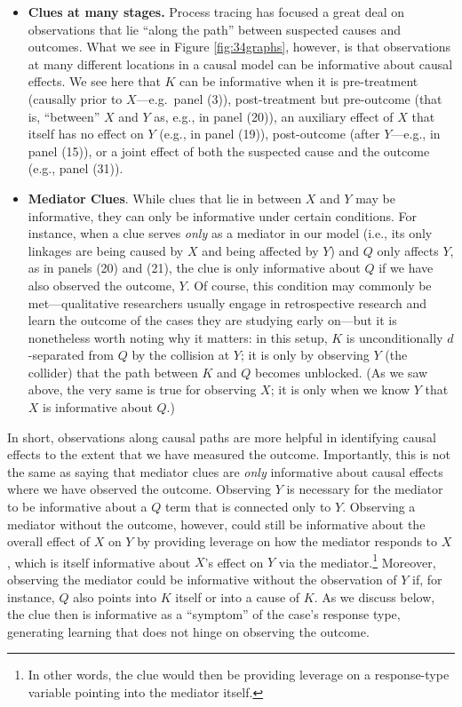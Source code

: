 \documentclass[
  12pt,
]{book}
\begin{document}
\begin{itemize}
\item
  \textbf{Clues at many stages.} Process tracing has focused a great deal on observations that lie ``along the path'' between suspected causes and outcomes. What we see in Figure \ref{fig:34graphs}, however, is that observations at many different locations in a causal model can be informative about causal effects. We see here that \(K\) can be informative when it is pre-treatment (causally prior to \(X\)---e.g.~panel (3)), post-treatment but pre-outcome (that is, ``between'' \(X\) and \(Y\) as, e.g., in panel (20)), an auxiliary effect of \(X\) that itself has no effect on \(Y\) (e.g., in panel (19)), post-outcome (after \(Y\)---e.g., in panel (15)), or a joint effect of both the suspected cause and the outcome (e.g., panel (31)).
\item
  \textbf{Mediator Clues}. While clues that lie in between \(X\) and \(Y\) may be informative, they can only be informative under certain conditions. For instance, when a clue serves \emph{only} as a mediator in our model (i.e., its only linkages are being caused by \(X\) and being affected by \(Y\)) and \(Q\) only affects \(Y\), as in panels (20) and (21), the clue is only informative about \(Q\) if we have also observed the outcome, \(Y\). Of course, this condition may commonly be met---qualitative researchers usually engage in retrospective research and learn the outcome of the cases they are studying early on---but it is nonetheless worth noting why it matters: in this setup, \(K\) is unconditionally \(d\)-separated from \(Q\) by the collision at \(Y\); it is only by observing \(Y\) (the collider) that the path between \(K\) and \(Q\) becomes unblocked. (As we saw above, the very same is true for observing \(X\); it is only when we know \(Y\) that \(X\) is informative about \(Q\).)
\end{itemize}

In short, observations along causal paths are more helpful in identifying causal effects to the extent that we have measured the outcome. Importantly, this is not the same as saying that mediator clues are \emph{only} informative about causal effects where we have observed the outcome. Observing \(Y\) is necessary for the mediator to be informative about a \(Q\) term that is connected only to \(Y\). Observing a mediator without the outcome, however, could still be informative about the overall effect of \(X\) on \(Y\) by providing leverage on how the mediator responds to \(X\), which is itself informative about \(X\)'s effect on \(Y\) via the mediator.\footnote{In other words, the clue would then be providing leverage on a response-type variable pointing into the mediator itself.} Moreover, observing the mediator could be informative without the observation of \(Y\) if, for instance, \(Q\) also points into \(K\) itself or into a cause of \(K\). As we discuss below, the clue then is informative as a ``symptom'' of the case's response type, generating learning that does not hinge on observing the outcome.
\end{document}
